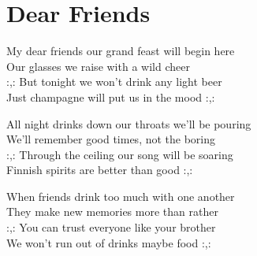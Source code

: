 \section{Dear Friends}
My dear friends our grand feast will begin here\\
Our glasses we raise with a wild cheer\\
:,: But tonight we won't drink any light beer\\
Just champagne will put us in the mood :,:

All night drinks down our throats we'll be pouring\\
We'll remember good times, not the boring\\
:,: Through the ceiling our song will be soaring\\
Finnish spirits are better than good :,:

When friends drink too much with one another\\
They make new memories more than rather\\
:,: You can trust everyone like your brother\\
We won't run out of drinks maybe food :,:
